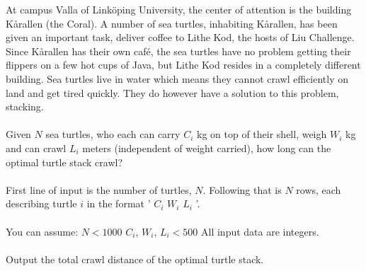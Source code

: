 At campus Valla of Linköping University, the center of attention is the building Kårallen (the Coral). A number of sea turtles, inhabiting Kårallen, has been given an important task, deliver coffee to Lithe Kod, the hosts of Liu Challenge. Since Kårallen has their own café, the sea turtles have no problem getting their flippers on a few hot cups of Java, but Lithe Kod resides in a completely different building. Sea turtles live in water which means they cannot crawl efficiently on land and get tired quickly. They do however have a solution to this problem, stacking.\\
\\
Given $N$ sea turtles, who each can carry $C_i$ kg on top of their shell, weigh $W_i$ kg and can crawl $L_i$ meters (independent of weight carried), how long can the optimal turtle stack crawl?\\
\\
First line of input is the number of turtles, $N$. Following that is $N$ rows, each describing turtle $i$ in the format ' $C_i$ $W_i$ $L_i$ '.\\
\\
You can assume: \newline
$N < 1000$ \newline
$C_i$, $W_i$, $L_i < 500$ \newline
All input data are integers.\\
\\
Output the total crawl distance of the optimal turtle stack.
